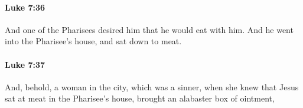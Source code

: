 		\paragraph{Luke 7:36} %
			\label{LUKE-7-36}

			And one of the Pharisees desired him that he would eat with him. And he went into the Pharisee's house, and sat down to meat.

			\begin{framed}
			\scriptsize
				\begin{compactdesc}
					\item[SBLG] 
				\end{compactdesc}
			\end{framed}

		\paragraph{Luke 7:37} %
			\label{LUKE-7-37}

			And, behold, a woman in the city, which was a sinner, when she knew that Jesus sat at meat in the Pharisee's house, brought an alabaster box of ointment,


